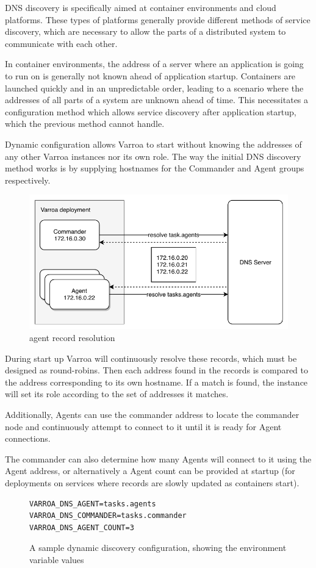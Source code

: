 DNS discovery is specifically aimed at container environments and cloud platforms. These types of platforms generally provide different methods of service discovery, which are necessary to allow the parts of a distributed system to communicate with each other.

In container environments, the address of a server where an application is going to run on is generally not known ahead of application startup. Containers are launched quickly and in an unpredictable order, leading to a scenario where the addresses of all parts of a system are unknown ahead of time. This necessitates a configuration method which allows service discovery after application startup, which the previous method cannot handle.


Dynamic configuration allows Varroa to start without knowing the addresses of any other Varroa instances nor its own role. The way the initial DNS discovery method works is by supplying hostnames for the Commander and Agent groups respectively.


\begin{figure}[h]
\begin{center}
\includegraphics[scale=0.8]{Resources/PDF/ExecutionDnsDiscovery}
\caption{agent record resolution}
\end{center}
\end{figure}

During start up Varroa will continuously resolve these records, which must be designed as round-robins.
Then each address found in the records is compared to the address corresponding to its own hostname. 
If a match is found, the instance will set its role according to the set of addresses it matches.

Additionally, Agents can use the commander address to locate the commander node and continuously attempt to connect to it until it is ready for Agent connections.

The commander can also determine how many Agents will connect to it using the Agent address, or alternatively a Agent count can be  provided at startup (for deployments on services where records are slowly updated as containers start).

\begin{figure}
\begin{lstlisting}
VARROA_DNS_AGENT=tasks.agents
VARROA_DNS_COMMANDER=tasks.commander
VARROA_DNS_AGENT_COUNT=3
\end{lstlisting}
\caption{A sample dynamic discovery configuration, showing the environment variable values}
\end{figure}
